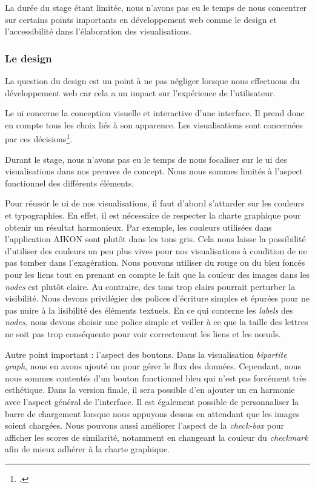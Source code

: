 La durée du stage étant limitée, nous n'avons pas eu le temps de nous concentrer sur certains points importants en développement web comme le design et l'accessibilité dans l'élaboration des visualisations. 

\subsubsection{Le design}

La question du design est un point à ne pas négliger lorsque nous effectuons du développement web car cela a un impact sur l'expérience de l'utilisateur.

Le \gls{ui} concerne la conception visuelle et interactive d'une interface. Il prend donc en compte tous les choix liés à son apparence. Les visualisations sont concernées par ces décisions\footcite{snowebGuideLUIDesign}.

Durant le stage, nous n'avons pas eu le temps de nous focaliser sur le \gls{ui} des visualisations dans nos preuves de concept. Nous nous sommes limités à l'aspect fonctionnel des différents éléments. 

Pour réussir le \gls{ui} de nos visualisations, il faut d'abord s'attarder sur les couleurs et typographies. En effet, il est nécessaire de respecter la charte graphique pour obtenir un résultat harmonieux. Par exemple, les couleurs utilisées dans l'application AIKON sont plutôt dans les tons gris. Cela nous laisse la possibilité d'utiliser des couleurs un peu plus vives pour nos visualisations à condition de ne pas tomber dans l'exagération. Nous pouvons utiliser du rouge ou du bleu foncés pour les liens tout en prenant en compte le fait que la couleur des images dans les \textit{nodes} est plutôt claire. Au contraire, des tons trop clairs pourrait perturber la visibilité. Nous devons privilégier des polices d'écriture simples et épurées pour ne pas nuire à la lisibilité des éléments textuels. En ce qui concerne les \textit{labels} des \textit{nodes}, nous devons choisir une police simple et veiller à ce que la taille des lettres ne soit pas trop conséquente pour voir correctement les liens et les nœuds.

Autre point important : l'aspect des boutons. Dans la visualisation \textit{bipartite graph}, nous en avons ajouté un pour gérer le flux des données. Cependant, nous nous sommes contentés d'un bouton fonctionnel bleu qui n'est pas forcément très esthétique. Dans la version finale, il sera possible d'en ajouter un en harmonie avec l'aspect général de l'interface. Il est également possible de personnaliser la barre de chargement lorsque nous appuyons dessus en attendant que les images soient chargées. Nous pouvons aussi améliorer l'aspect de la \textit{check-box} pour afficher les scores de similarité, notamment en changeant la couleur du \textit{checkmark} afin de mieux adhérer à la charte graphique. 


